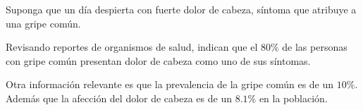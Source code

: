 \addpoints

\question[15] Suponga que un día despierta con fuerte dolor de cabeza, síntoma que atribuye a una gripe común. 

Revisando reportes de organismos de salud,  indican que el $80\%$ de las personas con gripe común presentan dolor de cabeza como uno de sus síntomas.

Otra información relevante es que la prevalencia de la gripe común es de un $10\%$. Además que la afección del dolor de cabeza es de un $8.1\%$ en la población.

\noaddpoints
{}

